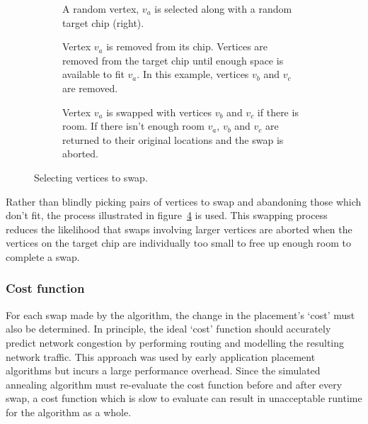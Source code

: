 				\begin{figure}
					\center
					\begin{subfigure}{\linewidth}
						\center
						\caption{A random vertex, $v_a$ is selected along with a random
						target chip (right).}
						\label{fig:sa-swap-select}
					\end{subfigure}
					
					\vspace*{1em}
					
					\begin{subfigure}{\linewidth}
						\center
						\caption{Vertex $v_a$ is removed from its chip. Vertices are removed
						from the target chip until enough space is available to fit $v_a$.
						In this example, vertices $v_b$ and $v_c$ are removed.}
						\label{fig:sa-swap-remove}
					\end{subfigure}
					
					\vspace*{1em}
					
					\begin{subfigure}{\linewidth}
						\center
						\caption{Vertex $v_a$ is swapped with vertices $v_b$ and $v_c$ if
						there is room. If there isn't enough room $v_a$, $v_b$ and $v_c$
						are returned to their original locations and the swap is aborted.}
						\label{fig:sa-swap-commit}
					\end{subfigure}
					
					\caption{Selecting vertices to swap.}
					\label{fig:sa-swap}
				\end{figure}
				
				Rather than blindly picking pairs of vertices to swap and abandoning
				those which don't fit, the process illustrated in
				figure~\ref{fig:sa-swap} is used. This swapping process reduces the
				likelihood that swaps involving larger vertices are aborted when the
				vertices on the target chip are individually too small to free up
				enough room to complete a swap.
			
			\subsubsection{Cost function}
				
				For each swap made by the algorithm, the change in the placement's
				`cost' must also be determined. In principle, the ideal `cost' function
				should accurately predict network congestion by performing routing and
				modelling the resulting network traffic. This approach was used by
				early application placement algorithms \cite{steele85} but incurs a
				large performance overhead. Since the simulated annealing algorithm
				must re-evaluate the cost function before and after every swap, a cost
				function which is slow to evaluate can result in unacceptable runtime
				for the algorithm as a whole.
				
